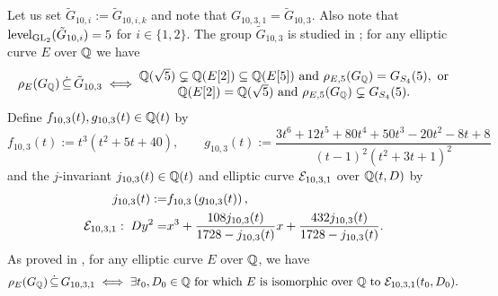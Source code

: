 Let us set $\tilde{G}_{10,i} := \tilde{G}_{10,i,k}$ and note that $G_{10,3,1} = \tilde{G}_{10,3}$. Also note that
$\operatorname{level}_{\operatorname{GL}_2}(\tilde{G}_{10,i}) = 5$ for $i \in \{1, 2 \}$. The group $\tilde{G}_{10,3}$ is studied in \cite{jonesmcmurdy}; for any elliptic curve $E$ over $\mathbb{Q}$ we have
\[
\rho_{E}(G_{\mathbb{Q}}) \, \dot\subseteq \, \tilde{G}_{10,3} \; \Longleftrightarrow \; 
\begin{matrix} 
\mathbb{Q}(\sqrt{5}) \subsetneq \mathbb{Q}(E[2]) \subseteq \mathbb{Q}(E[5]) \text{ and } \rho_{E,5}(G_{\mathbb{Q}}) = G_{S_4}(5), \text{ or} \\
\mathbb{Q}(E[2]) = \mathbb{Q}(\sqrt{5}) \text{ and } \rho_{E,5}(G_{\mathbb{Q}}) \subsetneq G_{S_4}(5).
\end{matrix} 
\]
Define $f_{10,3}(t), g_{10,3}(t) \in \mathbb{Q}(t)$ by
\[
f_{10,3}(t) := t^3(t^2 + 5t + 40), \quad\quad g_{10,3}(t) := \frac{3t^6 + 12t^5 + 80t^4 + 50t^3 - 20t^2 - 8t + 8}{(t-1)^2(t^2 + 3t + 1)^2}
\]
and the $j$-invariant $j_{10,3}(t) \in \mathbb{Q}(t)$ and elliptic curve $\mathcal{E}_{10,3,1}$ over $\mathbb{Q}(t,D)$ by
\[
\begin{split}
j_{10,3}(t) :=& f_{10,3}\left( g_{10,3}(t) \right), \\
\mathcal{E}_{10,3,1} : \; D y^2 =& x^3 + \frac{108j_{10,3}(t)}{1728 - j_{10,3}(t)} x + \frac{432 j_{10,3}(t)}{1728 - j_{10,3}(t)}.
\end{split}
\]
As proved in \cite{jonesmcmurdy}, for any elliptic curve $E$ over $\mathbb{Q}$, we have
\begin{equation*} %
\rho_{E}(G_\mbq) \, \dot\subseteq \, G_{10,3,1} \; \Longleftrightarrow \; \exists t_0, D_0 \in \mbq \text{ for which } E \text{ is isomorphic over $\mbq$ to } \mc{E}_{10,3,1}(t_0,D_0).
\end{equation*}

